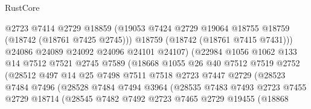 \begin{lexlean}{RustCore}
\begin{coremodule}
                              @2723
                              @7414
                              @2729
                              @18859
                              (@19053
                                @7424
                                @2729
                                @19064
                                @18755
                                @18759
                                (@18742 (@18761 @7425 @2745)))
                              @18759
                              (@18742 (@18761 @7415 @7431)))
                            @24086
                            @24089
                            @24092
                            @24096
                            @24101
                            @24107)
                          (@22984
                            @1056
                            @1062
                            @133
                            @14
                            @7512
                            @7521
                            @2745
                            @7589
                            (@18668
                              @1055
                              @26
                              @40
                              @7512
                              @7519
                              @2752
                              (@28512
                                @497
                                @14
                                @25
                                @7498
                                @7511
                                @7518
                                @2723
                                @7447
                                @2729
                                (@28523
                                  @7484
                                  @7496
                                  (@28528
                                    @7484
                                    @7494
                                    @3964
                                    (@28535
                                      @7483
                                      @7493
                                      @2723
                                      @7455
                                      @2729
                                      @18714
                                      (@28545
                                        @7482
                                        @7492
                                        @2723
                                        @7465
                                        @2729
                                        @19455
                                        (@18868

\end{coremodule}
\end{lexlean}
